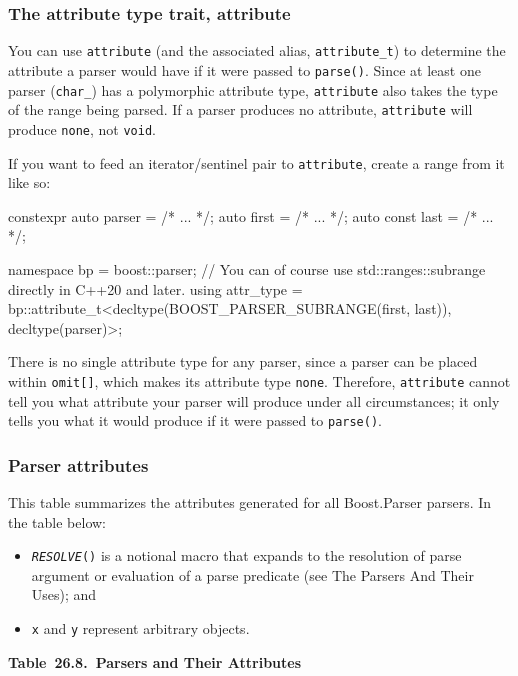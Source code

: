 \subsubsection{The attribute type trait, attribute}

You can use \texttt{attribute} (and the associated alias, \texttt{attribute\_t}) to determine the attribute a parser would have if it were passed to \texttt{parse()}. Since at least one parser (\texttt{char\_}) has a polymorphic attribute type, \texttt{attribute} also takes the type of the range being parsed. If a parser produces no attribute, \texttt{attribute} will produce \texttt{none}, not \texttt{void}.

If you want to feed an iterator/sentinel pair to \texttt{attribute}, create a range from it like so:

\begin{code}
constexpr auto parser = /* ... */;
auto first = /* ... */;
auto const last = /* ... */;

namespace bp = boost::parser;
// You can of course use std::ranges::subrange directly in C++20 and later.
using attr_type = bp::attribute_t<decltype(BOOST_PARSER_SUBRANGE(first, last)), decltype(parser)>;
\end{code}

There is no single attribute type for any parser, since a parser can be placed within \texttt{omit{[}{]}}, which makes its attribute type \texttt{none}. Therefore, \texttt{attribute} cannot tell you what attribute your parser will produce under all circumstances; it only tells you what it would produce if it were passed to \texttt{parse()}.

\subsubsection{Parser attributes}

This table summarizes the attributes generated for all Boost.Parser parsers. In the table below:

\begin{itemize}
\item
  \emph{\texttt{RESOLVE}}\texttt{()} is a notional macro that expands to the resolution of parse argument or evaluation of a parse predicate (see The Parsers And Their Uses); and
\item
  \texttt{x} and \texttt{y} represent arbitrary objects.
\end{itemize}

\textbf{Table~26.8.~Parsers and Their Attributes}

